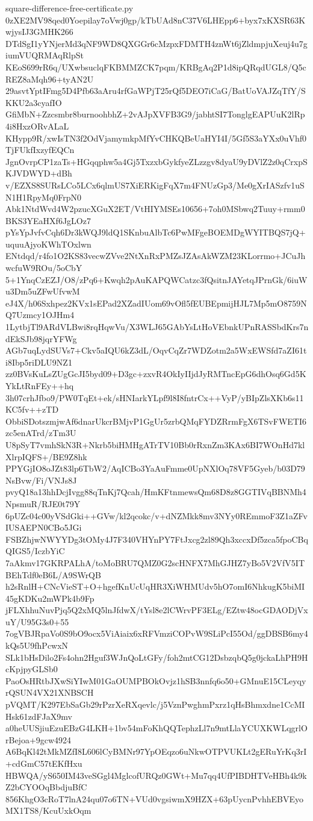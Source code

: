 \documentclass[11pt]{article}
\theoremstyle{definition}
\theoremstyle{remark}
\begin{document}
\begin{filecontents*}[overwrite]{square-difference-free-certificate.py}
0zXE2MV98qed0Yoepilay7oVwj0gp/kTbUAd8nC37V6LHEpp6+byx7xKXSR63KwjysIJ3GMHK266
DTdSgI1yYNjerMd3qNF9WD8QXGGr6cMzpxFDMTH4znWt6jZldmpjuXeuj4u7giumVUQRMAqRlpSt
KEoS699rR6q/UXwbsuclqFKBMMZCK7pqm/KRBgAq2P1d8ipQRqdUGL8/Q5cREZ8aMqh96+tyAN2U
29asvtYptIFmg5D4Pfb63aAru4rfGaWPjT25rQf5DEO7iCaG/BatUoVAJZqTfY/SKKU2a3cyafIO
GfiMbN+Zzcsmbr8burnoohbhZ+2vAJpXVFB3G9/jabhtSI7TonglgEAPUuK2lRp4i8HxzORvALaL
KHypp9R/xwIsTN3f2OdVjamymkpMfYvCHKQBeUaHYI4I/5Gf5S3aYXx0uVhf0TjFUkfIxzyfEQCn
JgnOvrpCP1zaTs+HGqqphw5a4Gj5TxzxbGykfyeZLzzgv8dyaU9yDVlZ2z0qCrxpSKJVDWYD+dBh
v/EZXS8SURsLCo5LCx6qlmUS7XiERKigFqX7m4FNUzGp3/Me0gXrIASzfv1uSN1H1RpyMq0FrpN0
Abk1NtdWvd4W2pzucXGuX2ET/VtHIYMSEs10656+7oh0MSbwq2Tuuy+rmm0BKS3YEaHXf6JgLOz7
pYsYpJvfvCqh6Dr3kWQJ9ldQ1SKnbuAlbTc6PwMFgeBOEMDgWYITBQS7jQ+uquuAjyoKWhTOxlwn
ENtdqd/r4fo1O2KS83vecwZVve2NtXnRxPMZsJZAsAkWZM23KLorrmo+JCuJhwcfuW9ROu/5oCbY
5+1YnqCzEZJ/O8/zPq6+Kwqh2pAuKAPQWCatzc3fQsitnJAYetqJPrnGk/6iuWu3Dm5uZFwUfvwM
eJ4X/h06Sxhpez2KVx1sEPad2XZadIUom69vOfl5fEUBEpmijHJL7Mp5mO8759NQ7Uzmcy1OJHm4
1LytbjTl9ARdVLBwi8rqHqwVu/X3WLJ65GAbYsLtHoVEbnkUPnRASSbdKrs7ndEkSJb98jqrYFWg
AGb7uqLydSUVs7+Ckv5aIQU6kZ3dL/OqvCqZr7WDZotm2a5WxEWSfd7aZI61ti8Ibp5riDLU9NZ1
zz0BVsKuLsZUgGcJI5byd09+D3gc+zxvR4OkIyIIjdJyRMTncEpG6dhOsq6Gd5KYkLtRnFEy++hq
3h07crhJfbo9/PW0TqEt+ek/sHNIarkYLpf9l8I8fntrCx++VyP/yBIpZlsXKb6s11KC5fv++zTD
ObbiSDotszmjwAf6dnarUkcrBMjvP1GgUr5zrbQMqFYDZRrmFgX6TSvFWETI6zc5enATrd/zTm3U
U8pSyT7vmhSkN3R+Nkrb5biHMHgATrTV10Bb0rRxnZm3KAx6BI7WOnHd7klXlrpIQFS+/BE9Z8hk
PPYGjIO8oJZt83lp6TbW2/AqICBo3YaAuFmme0UpNXlOq78VF5Gyeb/b03D79NsBvw/Fi/VNJs8J
pvyQ18a13hhDcjIvgg88qTnKj7Qcah/HmKFtnmewsQm68D8z8GGTIVqBBNMh4NpsmuR/RJE0t79Y
6pUZc04c00yVSdGki++GVw/kl2qcokc/v+dNZMkk8mv3NYy0REmmoF3Z1aZFvIUSAEPN0CBo5JGi
FSBZhjwNWYYDg3tOMy4J7F340VHYnPY7FtJxcg2zl89Qh3xccxDf5zca5fpoCBqQIGS5/IczbYiC
7aAkmv17GKRPALhA/toMoBRU7QMZ0G2scHNFX7MhGJHZ7yBo5V2VfV5ITBEhTdf0eB6L/A9SWrQB
h2sRnlH+CNcVieST+O+hgefKnUcUqHR3XiWHMUdv5hO7omI6NhkugK5biMI45gKDKu2mWPk4b9Fp
jFLXhhuNuvPjq5Q2xMQ5lnJfdwX/tYsl8e2lCWrvPF3ELg/EZtw48ocGDAODjVxuY/U95G3s0+55
7ogVBJRpaVo0S9bO9ocx5ViAiaix6xRFVmziCOPvW9SLiPcI55Od/ggDBSB6my4kQs5U9fhPcwxN
SLk1bHsDilo2Fs4ohn2Hguf3WJnQoLtGFy/foh2mtCG12DsbzqbQ5g0jckaLhPH9HcKpjpyGLSb0
PaoOsHRtbJXwSiYIwM01GaOUMPBOkOvjz1hSB3nnfq6o50+GMnuE15CLeyqyrQSUN4VX21XNBSCH
pVQMT/K297EbSaGb29rPzrXeRXqevlc/j5VznPwghmPxrz1qHsBhmxdne1CcMIHsk61zdFJaX9mv
a0heUUSjiuEzuEBzG4LKH+1bv54mFoKhQQTephzLl7n9mtLlaYCUXKWLqgrlOrBejoa+9gcw4924
A6BqKl42tMkMZfI8L606lCyBMNr97YpOEqzo6uNkwOTPVUKLt2gERuYrKq3rI+cdGmC57tEKfHxu
HBWQA/yS650IM43veSGgl4MglcofURQz0GWt+Mu7qq4UfPIBDHTVeHBh4k9kZ2bCYOOqBbdjuBfC
856KhgO3cRoT7lnA24qu07o6TN+VUd0vgsiwmX9HZX+63pUycnPvhhEBVEyoMX1TS8/KcuUxkOqm

\end{filecontents*}
\end{document}
